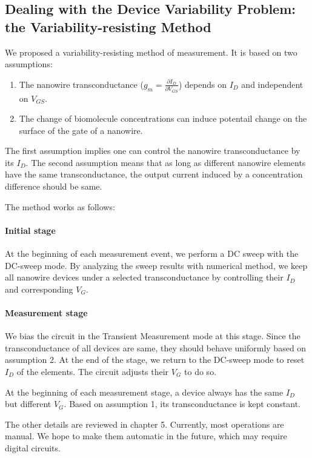 \subsection*{Dealing with the Device Variability Problem: the Variability-resisting Method} \label{section:twqAssumption}
We proposed a variability-resisting method of measurement.
It is based on two assumptions:
\begin{enumerate}
    \item The nanowire transconductance ($g_m = \frac{\partial I_D}{\partial V_{GS}}$) depends on $I_D$ and independent on $V_{GS}$.
    \item The change of biomolecule concentrations can induce potentail change on the surface of the gate of a nanowire.
\end{enumerate}
The first assumption implies one can control the nanowire transconductance by its $I_D$.
The second assumption means that as long as different nanowire elements have the same transconductance, the output current induced by a concentration difference should be same.

The method works as follows:

\paragraph*{Initial stage}
At the beginning of each measurement event, we perform a DC sweep with the DC-sweep mode.
By analyzing the sweep results with numerical method, we keep all nanowire devices under a selected transconductance by controlling their $I_D$ and corresponding $V_G$.

\paragraph*{Measurement stage}
We bias the circuit in the Transient Measurement mode at this stage.
Since the transconductance of all devices are same, they should behave uniformly based on assumption 2.
At the end of the stage, we return to the DC-sweep mode to reset $I_D$ of the elements.
The circuit adjusts their $V_G$ to do so.

At the beginning of each measurement stage, a device always has the same $I_D$ but different $V_G$.
Based on assumption 1, its transconductance is kept constant.

The other details are reviewed in chapter 5.
Currently, most operations are manual.
We hope to make them automatic in the future, which may require digital circuits.

